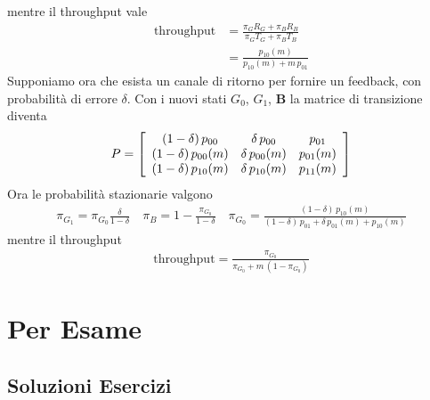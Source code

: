 \documentclass{article}
\begin{document}
mentre il throughput vale
\begin{align*}
\text{throughput} &= \frac{\pi_G R_G + \pi_B R_B}{\pi_G T_G + \pi_B T_B}\\
&= \frac{p_{10}(m)}{p_{10}(m) + m\,p_{01}}
\end{align*}
Supponiamo ora che esista un canale di ritorno per fornire un feedback, con probabilità di errore $\delta$. Con i nuovi stati \textbf{$G_0$}, \textbf{$G_1$}, \textbf{B} la matrice di transizione diventa
\begin{align*}
P = \left[\begin{array}{c c c}
(1-\delta)\,p_{00} & \delta\,p_{00} & p_{01}\\
(1-\delta)\,p_{00}(m) & \delta\,p_{00}(m) & p_{01}(m)\\
(1-\delta)\,p_{10}(m) & \delta\,p_{10}(m) & p_{11}(m)\\
\end{array}\right]
\end{align*}
Ora le probabilità stazionarie valgono
\begin{gather*}
\pi_{G_1} = \pi_{G_0}\frac{\delta}{1-\delta} \quad \pi_B = 1-\frac{\pi_{G_0}}{1-\delta} \quad \pi_{G_0} = \frac{(1-\delta)\,p_{10}(m)}{(1-\delta)\,p_{01} + \delta\,p_{01}(m) + p_{10}(m)} 
\end{gather*}
mentre il throughput
\begin{gather*}
\text{throughput} = \frac{\pi_{G_0}}{\pi_{G_0} + m\,(1-\pi_{G_0})}
\end{gather*}


\newpage
\section{Per Esame}


\subsection{Soluzioni Esercizi}
\end{document}
